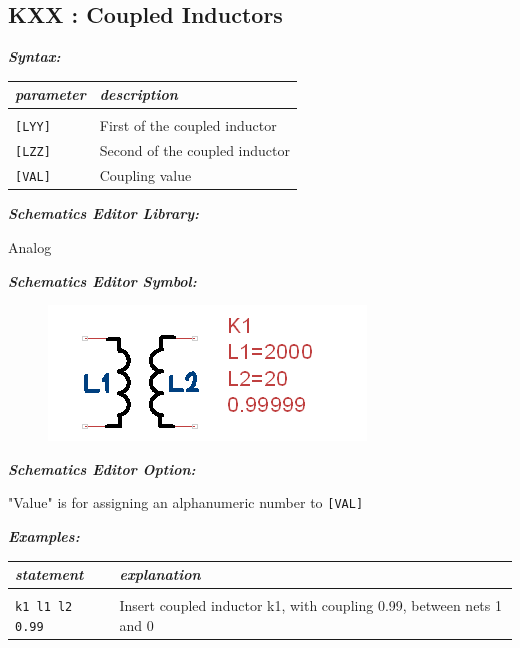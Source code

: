 \newpage
\subsection{KXX : Coupled Inductors}
\label{subsec_sceadm_coupledinductors}

\textbf{\textit{Syntax:}}


\begin{longtable}{l l}
\textit{parameter} & \textit{description} \\ \hline \\ \vspace{-0.8\parskip}
\texttt{[LYY]} & First of the coupled inductor \\
\texttt{[LZZ]} & Second of the coupled inductor \\
\texttt{[VAL]} & Coupling value \\ 
\end{longtable}


\textbf{\textit{Schematics Editor Library:}}

Analog

\textbf{\textit{Schematics Editor Symbol:}}

\begin{figure}[htb]
  \begin{center}
    \includegraphics[height=0.08\textheight]{./pics/SpiceEl/CInductor.png}
  \end{center}
\end{figure}

\textbf{\textit{Schematics Editor Option:}}

"\textsf{Value}" is for assigning an alphanumeric number to \texttt{[VAL]}

\textbf{\textit{Examples:}}

\begin{longtable}{l l}
\textit{statement} & \textit{explanation} \\ \hline \\ \vspace{-0.8\parskip} 
\begin{minipage}{15em}\texttt{k1 l1 l2 0.99}\end{minipage} & 
\begin{minipage}{15em}{\small Insert coupled inductor k1, with coupling 0.99, between nets 1 and 0}\end{minipage} \\
\end{longtable}



